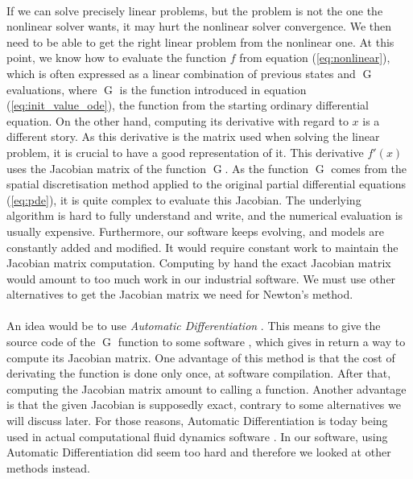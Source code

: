       \paragraph{}
      If we can solve precisely linear problems, but the problem is not the one the nonlinear solver wants, it may hurt the nonlinear solver convergence.
      We then need to be able to get the right linear problem from the nonlinear one.
      At this point, we know how to evaluate the function $f$ from equation (\ref{eq:nonlinear}), which is often expressed as a linear combination of previous states and $\operatorname{G}$ evaluations, where $\operatorname{G}$ is the function introduced in equation (\ref{eq:init_value_ode}), the function from the starting ordinary differential equation.
      On the other hand, computing its derivative with regard to $x$ is a different story.
      As this derivative is the matrix used when solving the linear problem, it is crucial to have a good representation of it.
      This derivative $f'\left(x\right)$ uses the Jacobian matrix of the function $\operatorname{G}$.
      As the function $\operatorname{G}$ comes from the spatial discretisation method applied to the original partial differential equations (\ref{eq:pde}), it is quite complex to evaluate this Jacobian.
      The underlying algorithm is hard to fully understand and write, and the numerical evaluation is usually expensive.
      Furthermore, our software keeps evolving, and models are constantly added and modified.
      It would require constant work to maintain the Jacobian matrix computation.
      Computing by hand the exact Jacobian matrix would amount to too much work in our industrial software.
      We must use other alternatives to get the Jacobian matrix we need for Newton's method.

      \paragraph{}
      An idea would be to use \emph{Automatic Differentiation} \cite{Griewank2000}.
      This means to give the source code of the $\operatorname{G}$ function to some software \cite{HascoeetPascual2012}, which gives in return a way to compute its Jacobian matrix.
      One advantage of this method is that the cost of derivating the function is done only once, at software compilation.
      After that, computing the Jacobian matrix amount to calling a function.
      Another advantage is that the given Jacobian is supposedly exact, contrary to some alternatives we will discuss later.
      For those reasons, Automatic Differentiation is today being used in actual computational fluid dynamics software \cite{BilanceriBeuxElmahiEtAl2011, KenwayMaderHeEtAl2019}.
      In our software, using Automatic Differentiation did seem too hard and therefore we looked at other methods instead.

